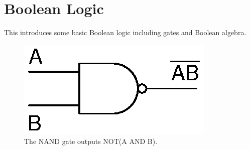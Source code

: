 \chapter{Boolean Logic}

This introduces some basic Boolean logic including gates and Boolean algebra.

\begin{figure}[!htb]
	\centering
	\includegraphics[scale=0.7]{logic/NAND.eps}
	\caption{The NAND gate outputs NOT(A AND B).}
	\label{fig:nand}
  \end{figure} 